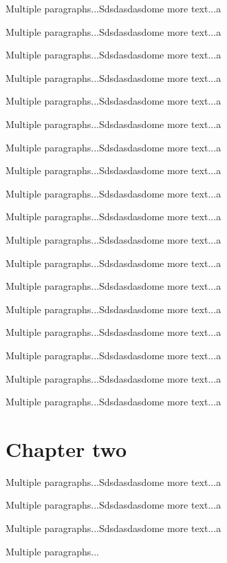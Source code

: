 \documentclass[doublespace,endnotes]{lingpaper}
\begin{document}
Multiple paragraphs...Sdsdasdasdome more text...a

Multiple paragraphs...Sdsdasdasdome more text...a

Multiple paragraphs...Sdsdasdasdome more text...a

Multiple paragraphs...Sdsdasdasdome more text...a

Multiple paragraphs...Sdsdasdasdome more text...a

Multiple paragraphs...Sdsdasdasdome more text...a

Multiple paragraphs...Sdsdasdasdome more text...a

Multiple paragraphs...Sdsdasdasdome more text...a

Multiple paragraphs...Sdsdasdasdome more text...a

Multiple paragraphs...Sdsdasdasdome more text...a

Multiple paragraphs...Sdsdasdasdome more text...a

Multiple paragraphs...Sdsdasdasdome more text...a

Multiple paragraphs...Sdsdasdasdome more text...a

Multiple paragraphs...Sdsdasdasdome more text...a

Multiple paragraphs...Sdsdasdasdome more text...a

Multiple paragraphs...Sdsdasdasdome more text...a

Multiple paragraphs...Sdsdasdasdome more text...a

Multiple paragraphs...Sdsdasdasdome more text...a

\chapter{Chapter two}

Multiple paragraphs...Sdsdasdasdome more text...a

Multiple paragraphs...Sdsdasdasdome more text...a

Multiple paragraphs...Sdsdasdasdome more text...a

Multiple paragraphs...

\end{document}
